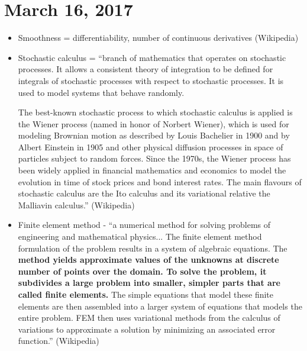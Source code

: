 \documentclass{article}
\begin{document}
\section*{March 16, 2017}
\begin{itemize}
\item Smoothness = differentiability, number of continuous derivatives (Wikipedia) 
\item Stochastic calculus = ``branch of mathematics that operates on stochastic processes. It allows a consistent theory of integration to be defined for integrals of stochastic processes with respect to stochastic processes. It is used to model systems that behave randomly.

The best-known stochastic process to which stochastic calculus is applied is the Wiener process (named in honor of Norbert Wiener), which is used for modeling Brownian motion as described by Louis Bachelier in 1900 and by Albert Einstein in 1905 and other physical diffusion processes in space of particles subject to random forces. Since the 1970s, the Wiener process has been widely applied in financial mathematics and economics to model the evolution in time of stock prices and bond interest rates.
The main flavours of stochastic calculus are the Ito calculus and its variational relative the Malliavin calculus.'' (Wikipedia) 

\item Finite element method - ``a numerical method for solving problems of engineering and mathematical physics... The finite element method formulation of the problem results in a system of algebraic equations. The {\bf method yields approximate values of the unknowns at discrete number of points over the domain. To solve the problem, it subdivides a large problem into smaller, simpler parts that are called finite elements.} The simple equations that model these finite elements are then assembled into a larger system of equations that models the entire problem. FEM then uses variational methods from the calculus of variations to approximate a solution by minimizing an associated error function.'' (Wikipedia) 
\end{itemize}
\end{document}

